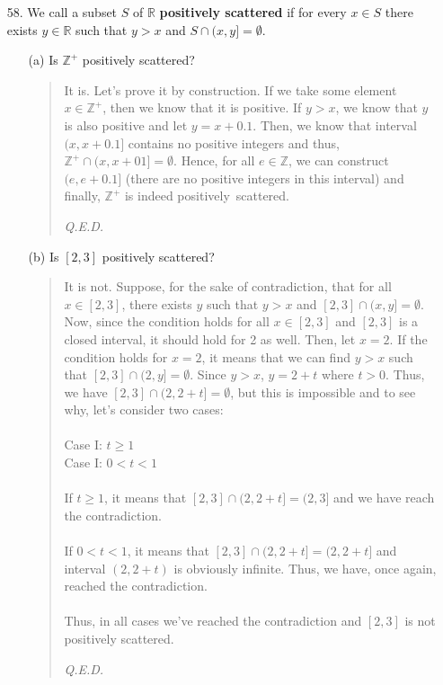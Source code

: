 \documentclass[12pt, a4paper]{article}                      %
\begin{document}
\begin{itemize}
\item[]
\item[]

\item[58.]
We call a subset $S$ of $\mathbb{R}$ \textbf{positively scattered} if for every $x \in S$
there exists $y \in \mathbb{R}$ such that $y > x$ and $S \cap (x,y] = \emptyset$. 
\begin{itemize}
\item[(a)]
Is $\mathbb{Z}^+$ positively scattered? 
\begin{quote}
It is. Let's prove it by construction. If we take some element $x \in \mathbb{Z}^+$, then we know that it is positive.
If $y > x$, we know that $y$ is also positive and let $y = x + 0.1$. Then, we know that interval $(x, x + 0.1]$
contains no positive integers and thus, $\mathbb{Z}^+ \cap (x, x + 01] = \emptyset$. Hence, for all $e \in \mathbb{Z}$, we can
construct $(e, e+0.1]$ (there are no positive integers in this interval) and finally, $\mathbb{Z}^+$ is indeed positively\
scattered.
\begin{flushright}
\textit{Q.E.D.}
\end{flushright}
\end{quote}

\item[]

\item[(b)]
Is $[2, 3]$ positively scattered? 
\begin{quote}
It is not. Suppose, for the sake of contradiction, that for all $x \in [2, 3]$, there
exists $y$ such that $y > x$ and $[2, 3] \cap (x, y] = \emptyset$. Now, since the condition
holds for all $x \in [2, 3]$ and $[2, 3]$ is a closed interval, it should hold for 2 as well.
Then, let $x = 2$. If the condition holds for $x = 2$, it means that we can find $y > x$ such
that $[2, 3] \cap (2, y] = \emptyset$. Since $y > x$, $y = 2 + t$ where $t > 0$. Thus,
we have $[2, 3] \cap (2, 2 + t] = \emptyset$, but this is impossible and to see why, let's
consider two cases:\\\\
Case I: $t \geq 1$\\
Case I: $0 < t <  1$\\\\
If $t \geq 1$, it means that $[2, 3] \cap (2, 2 + t] = (2, 3]$ and we have reach the contradiction.\\\\
If $0 < t < 1$, it means that $[2, 3] \cap (2, 2 + t] = (2, 2 + t]$ and interval $(2, 2 + t)$ is obviously infinite. Thus, we have, once again, reached the contradiction.\\\\
Thus, in all cases we've reached the contradiction and $[2, 3]$ is not positively scattered.
\begin{flushright}
\textit{Q.E.D.}
\end{flushright}
\end{quote}


\end{itemize}
\end{itemize}
\end{document}
